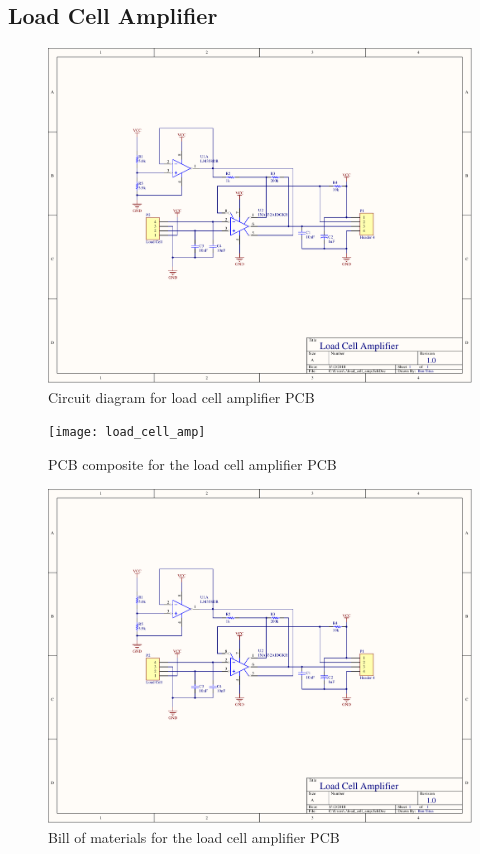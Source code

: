\begin{flushleft}
\section{Load Cell Amplifier}
\end{flushleft}
\label{app:load_cell_amp}
\begin{figure}[H]
	\centering
	\includegraphics[page=1,scale=0.8,angle=270]{PDFs/load_cell_amp.PDF}
	\caption{Circuit diagram for load cell amplifier PCB}
	\label{fig:load_cell_amp_circuit}
\end{figure}
\begin{figure}[H]
	\centering
	\texttt{[image: load\_cell\_amp]} 
	\caption{PCB composite for the load cell amplifier PCB}
	\label{fig:load_cell_amp_pcb}
\end{figure}
\begin{figure}[H]
	\centering
	\includegraphics[page=3,width=\textwidth]{PDFs/load_cell_amp.PDF} 
	\caption{Bill of materials for the load cell amplifier PCB}
	\label{fig:load_cell_amp_bom}
\end{figure}